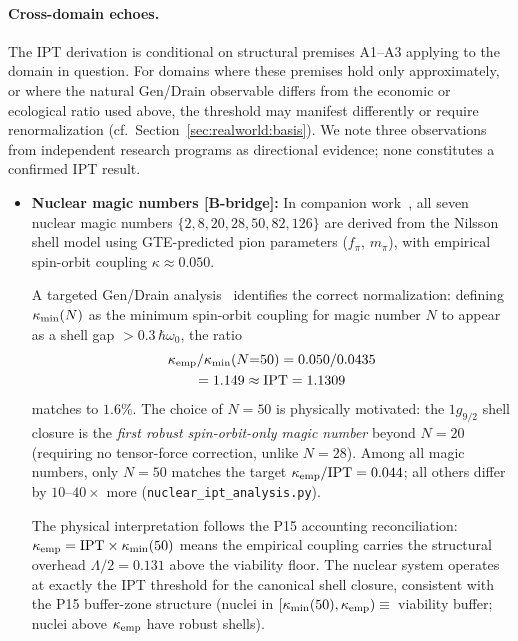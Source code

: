 \documentclass[11pt,twocolumn]{article}
\theoremstyle{remark}
\begin{document}
\paragraph{Cross-domain echoes.}
\label{par:cross-domain}

The IPT derivation is conditional on structural premises A1--A3 applying to the domain in question. For domains where these premises hold only approximately, or where the natural Gen/Drain observable differs from the economic or ecological ratio used above, the threshold may manifest differently or require renormalization (cf.\ Section~\ref{sec:realworld:basis}). We note three observations from independent research programs as directional evidence; none constitutes a confirmed IPT result.

\begin{itemize}[leftmargin=1.5em,itemsep=0.1em]
  \item \textbf{Nuclear magic numbers [B-bridge]:} In companion work~\cite{spivack2025nuclear_physics}, all seven nuclear magic numbers $\{2,8,20,28,50,82,126\}$ are derived from the Nilsson shell model using GTE-predicted pion parameters ($f_\pi$, $m_\pi$), with empirical spin-orbit coupling $\kappa \approx 0.050$.
  
  A targeted Gen/Drain analysis~\cite{spivack2025nuclear_physics} identifies the correct normalization: defining $\kappa_{\rm min}(N)$ as the minimum spin-orbit coupling for magic number $N$ to appear as a shell gap $> 0.3\,\hbar\omega_0$, the ratio
  \begin{multline*}
    \kappa_{\rm emp}/\kappa_{\rm min}(N{=}50) = 0.050/0.0435 \\
    = 1.149 \approx \mathrm{IPT} = 1.1309
  \end{multline*}
  matches to $1.6\%$.  The choice of $N=50$ is physically motivated: the $1g_{9/2}$ shell closure is the \emph{first robust spin-orbit-only magic number} beyond $N=20$ (requiring no tensor-force correction, unlike $N=28$). Among all magic numbers, only $N=50$ matches the target $\kappa_{\rm emp}/\mathrm{IPT} = 0.044$; all others differ by $10$--$40\times$ more (\texttt{nuclear\_ipt\_analysis.py}).
  
  The physical interpretation follows the P15 accounting reconciliation: $\kappa_{\rm emp} = \mathrm{IPT}\times\kappa_{\rm min}(50)$ means the empirical coupling carries the structural overhead $\Lambda/2 = 0.131$ above the viability floor. The nuclear system operates at exactly the IPT threshold for the canonical shell closure, consistent with the P15 buffer-zone structure (nuclei in $[\kappa_{\rm min}(50), \kappa_{\rm emp})\equiv$~viability buffer; nuclei above $\kappa_{\rm emp}$ have robust shells).
  

\end{itemize}
\end{document}
